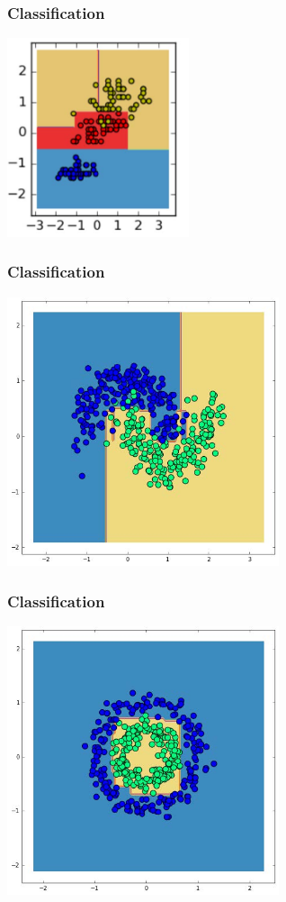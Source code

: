 \documentclass[default]{beamer}
\begin{document}
	\begin{frame}
		\frametitle{Classification}
		\centering
		\includegraphics[width=0.4\textwidth]{trees5.jpg}
	\end{frame}


	\begin{frame}
		\frametitle{Classification}
		\centering
		\includegraphics[width=0.6\textwidth]{trees6.jpg}
	\end{frame}

	\begin{frame}
		\frametitle{Classification}
		\centering
		\includegraphics[width=0.6\textwidth]{trees7.jpg}
	\end{frame}
\end{document}
